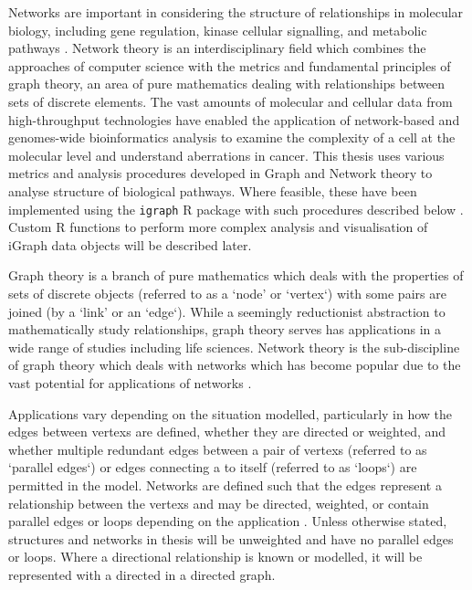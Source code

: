 Networks are important in considering the structure of relationships in molecular biology, including gene regulation, kinase cellular signalling, and metabolic \glspl{pathway} \citep{Barabasi2004}. Network theory is an interdisciplinary field which combines the approaches of computer science with the metrics and fundamental principles of graph theory, an area of pure mathematics dealing with relationships between sets of discrete elements. The vast amounts of molecular and cellular data from high-throughput technologies have enabled the application of network-based and \glspl{genome}-wide \gls{bioinformatics} analysis to examine the complexity of a cell at the molecular level and understand aberrations in cancer. This thesis uses various metrics and analysis procedures developed in Graph and Network theory to analyse  structure of biological \glspl{pathway}. Where feasible, these have been implemented using the \texttt{igraph} R package with such procedures described below \citep{igraph}. Custom R functions to perform more complex analysis and visualisation of iGraph data objects will be described later.

Graph theory is a branch of pure mathematics which deals with the properties of sets of discrete objects (referred to as a `node' or `vertex`) with some pairs are joined (by a `link' or an `edge`). While a seemingly reductionist abstraction to mathematically study relationships, graph theory serves has applications in a wide range of studies including life sciences. Network theory is the sub-discipline of graph theory which deals with networks which has become popular due to the vast potential for applications of networks \citep{vanSteen2010}. 

Applications vary depending on the situation modelled, particularly in how the \glspl{edge} between \glspl{vertex} are defined, whether they are directed or weighted, and whether multiple redundant \glspl{edge} between a pair of \glspl{vertex} (referred to as `parallel \glspl{edge}`) or \glspl{edge} connecting a  to itself (referred to as `loops`) are permitted in the model. Networks are defined such that the \glspl{edge} represent a relationship between the \glspl{vertex} and may be directed, weighted, or contain parallel \glspl{edge} or loops depending on the application \citep{vanSteen2010}. Unless otherwise stated,  structures and networks in thesis will be unweighted and have no parallel \glspl{edge} or loops. Where a directional relationship is known or modelled, it will be represented with a directed  in a directed graph.

